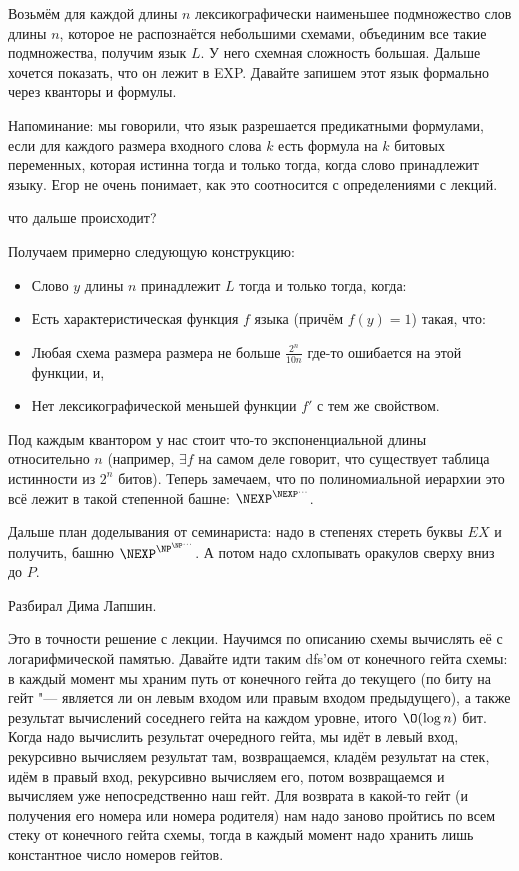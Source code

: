 	Возьмём для каждой длины $n$ лексикографически наименьшее подмножество слов длины $n$,
	которое не распознаётся небольшими схемами, объединим все такие подмножества, получим язык $L$.
	У него схемная сложность большая.
	Дальше хочется показать, что он лежит в EXP.
	Давайте запишем этот язык формально через кванторы и формулы.
	\begin{Rem}
		Напоминание: мы говорили, что язык разрешается предикатными формулами, если
		для каждого размера входного слова $k$ есть формула на $k$ битовых переменных,
		которая истинна тогда и только тогда, когда слово принадлежит языку.
		\TODO Егор не очень понимает, как это соотносится с определениями с лекций.
	\end{Rem}
	\TODO что дальше происходит?

	Получаем примерно следующую конструкцию:
	\begin{itemize}
		\item Слово $y$ длины $n$ принадлежит $L$ тогда и только тогда, когда:
		\item Есть характеристическая функция $f$ языка (причём $f(y)=1$) такая, что:
		\item Любая схема размера размера не больше $\frac{2^n}{10n}$ где-то ошибается на этой функции, и,
		\item Нет лексикографической меньшей функции $f'$ с тем же свойством.
	\end{itemize}
	Под каждым квантором у нас стоит что-то экспоненциальной длины относительно $n$ 
	(например, $\exists f$ на самом деле говорит, что существует таблица истинности из $2^n$ битов).
	Теперь замечаем, что по полиномиальной иерархии это всё лежит в такой степенной башне:
	$\NEXP^{\NEXP^{\dots}}$.
	
	Дальше план доделывания от семинариста: надо в степенях стереть буквы $EX$ и получить,
	башню $\NEXP^{\NP^{\NP^{\dots}}}$.
	А потом надо схлопывать оракулов сверху вниз до $P$.

	Разбирал Дима Лапшин.

	Это в точности решение с лекции.
	Научимся по описанию схемы вычислять её с логарифмической памятью.
	Давайте идти таким dfs'ом от конечного гейта схемы: в каждый момент
	мы храним путь от конечного гейта до текущего (по биту на гейт "---
	является ли он левым входом или правым входом предыдущего),
	а также результат вычислений соседнего гейта на каждом уровне, итого
	$\O(\log n)$ бит.
	Когда надо вычислить результат очередного гейта, мы идёт в левый вход,
	рекурсивно вычисляем результат там, возвращаемся, кладём результат на стек,
	идём в правый вход,	рекурсивно вычисляем его, потом возвращаемся и вычисляем
	уже непосредственно наш гейт.
	Для возврата в какой-то гейт (и получения его номера или номера родителя) нам
	надо заново пройтись по всем стеку от конечного гейта схемы, тогда в каждый
	момент надо хранить лишь константное число номеров гейтов.

